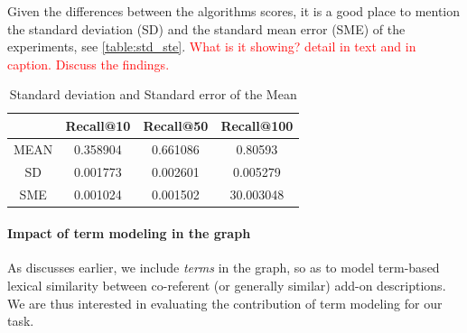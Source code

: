 \documentclass[11pt,oneside]{book}
\begin{document}
\par Given the differences between the algorithms scores, it is a good
place to mention the standard deviation (SD) and the standard mean error (SME) of the experiments, see
\autoref{table:std_ste}. \textcolor{red}{What is it showing? detail in text and in caption. Discuss the findings.}
\begin{table}[t]
\centering
\caption{Standard deviation and Standard error of the Mean}
\label{table:std_ste}
\begin{tabular}{|c|c|c|c|} \hline
 & Recall@10 & Recall@50 & Recall@100\\ \hline
MEAN & 0.358904 & 0.661086 & 0.80593\\ \hline
SD & 0.001773 & 0.002601 & 0.005279\\ \hline
SME & 0.001024 & 0.001502 & 30.003048\\ \hline
\end{tabular}
\end{table}

\paragraph{Impact of term modeling in the graph}

As discusses earlier, we include {\it terms} in the graph, so as to model term-based lexical similarity between co-referent (or generally similar) add-on descriptions. We are thus interested in evaluating the contribution of term modeling for our task.
\end{document}
